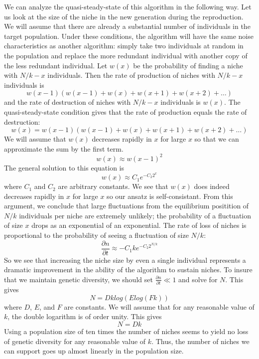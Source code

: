 We can analyze the quasi-steady-state of this algorithm in the following way.
Let us look at the
size of the niche in the new generation during the reproduction.  We will
assume that there are already a substantial number of individuals in
the target population.  Under these conditions, the algorithm will have
the same noise characteristics as another algorithm: simply take two
individuals at random in the population and replace the more redundant
individual with another copy of the less redundant individual.
Let $w(x)$ be the probability of finding a niche with $N/k-x$ individuals.
Then the rate of production of niches with $N/k-x$ individuals is
\begin{equation}
w(x-1)(w(x-1)+w(x)+w(x+1)+w(x+2)+\ldots)
\end{equation}
and the rate of destruction of niches with $N/k-x$ individuals is $w(x)$.
The quasi-steady-state condition gives that the rate of production equals
the rate of destruction:
\begin{equation}
w(x)=w(x-1)(w(x-1)+w(x)+w(x+1)+w(x+2)+\ldots)
\end{equation}
We will assume that $w(x)$ decreases rapidly in $x$ for large $x$ so that
we can approximate the sum by the first term.
\begin{equation}
w(x) \approx w(x-1)^2
\end{equation}
The general solution to this equation is
\begin{equation}
w(x) \approx C_1 e^{-C_2 2^x}
\end{equation}
where $C_1$ and $C_2$ are arbitrary constants.  We see that $w(x)$ does indeed
decreases rapidly in $x$ for large $x$ so our ansatz is self-consistant.
From this argument, we conclude that large fluctuations from the equilibrium
positition of $N/k$ individuals per niche are extremely unlikely; the
probability of a fluctuation of size $x$ drops as an exponential of an
exponential.  The rate of loss of niches is proportional to the probability
of seeing a fluctuation of size $N/k$:
\begin{equation}
\frac{\partial n}{\partial t} \approx -C_1 k e^{-C_2 2^{N/k}}
\end{equation}
So we see that increasing the niche size by even a single individual
represents a dramatic improvement in the ability of the algorithm to
sustain niches. To insure that we maintain genetic diversity, we should
set $\frac{\partial n}{\partial t} \ll 1$ and solve for $N$.  This
gives
\begin{equation}
N=D k log(E log(F k))
\end{equation}
where $D$, $E$, and $F$ are constants.  We will assume that for any
reasonable value of $k$, the double logarithm is of order unity.  This
gives
\begin{equation}
N=D k
\end{equation}
Using a population size of ten times the number of niches seems to yield
no loss of genetic diversity for any reasonable value of $k$.  Thus, the
number of niches we can support goes up almost linearly in the population
size.

